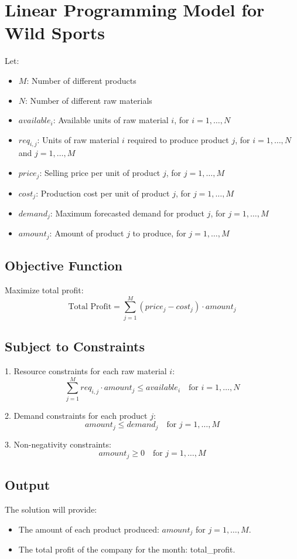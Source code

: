 \documentclass{article}
\begin{document}
\section*{Linear Programming Model for Wild Sports}

Let:
\begin{itemize}
    \item $M$: Number of different products
    \item $N$: Number of different raw materials
    \item $available_i$: Available units of raw material $i$, for $i = 1, \ldots, N$
    \item $req_{i,j}$: Units of raw material $i$ required to produce product $j$, for $i = 1, \ldots, N$ and $j = 1, \ldots, M$
    \item $price_j$: Selling price per unit of product $j$, for $j = 1, \ldots, M$
    \item $cost_j$: Production cost per unit of product $j$, for $j = 1, \ldots, M$
    \item $demand_j$: Maximum forecasted demand for product $j$, for $j = 1, \ldots, M$
    \item $amount_j$: Amount of product $j$ to produce, for $j = 1, \ldots, M$
\end{itemize}

\subsection*{Objective Function}
Maximize total profit:
\[
\text{Total Profit} = \sum_{j=1}^{M} (price_j - cost_j) \cdot amount_j
\]

\subsection*{Subject to Constraints}
1. Resource constraints for each raw material $i$:
\[
\sum_{j=1}^{M} req_{i,j} \cdot amount_j \leq available_i \quad \text{for } i = 1, \ldots, N
\]

2. Demand constraints for each product $j$:
\[
amount_j \leq demand_j \quad \text{for } j = 1, \ldots, M
\]

3. Non-negativity constraints:
\[
amount_j \geq 0 \quad \text{for } j = 1, \ldots, M
\]

\subsection*{Output}
The solution will provide:
\begin{itemize}
    \item The amount of each product produced: $amount_j$ for $j = 1, \ldots, M$.
    \item The total profit of the company for the month: total_profit.
\end{itemize}
\end{document}
